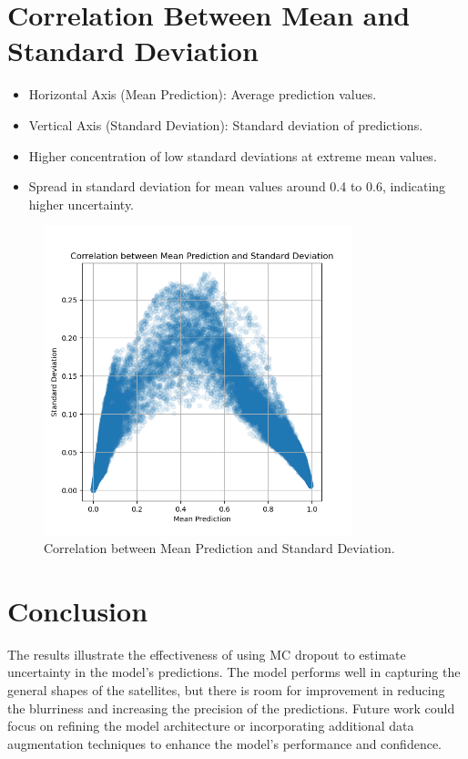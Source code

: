 \documentclass{article}
\begin{document}
\section{Correlation Between Mean and Standard Deviation}
\begin{itemize}
    \item Horizontal Axis (Mean Prediction): Average prediction values.
    \item Vertical Axis (Standard Deviation): Standard deviation of predictions.
    \item Higher concentration of low standard deviations at extreme mean values.
    \item Spread in standard deviation for mean values around 0.4 to 0.6, indicating higher uncertainty.
\end{itemize}

\begin{figure}[h]
    \centering
    \includegraphics[width=0.8\textwidth]{../images/MC_dropout/test_image[0]_correlation_between_mean_prediction_and_std.png}
    \caption{Correlation between Mean Prediction and Standard Deviation.}
    \label{fig:correlation_analysis}
\end{figure}

\section{Conclusion}
The results illustrate the effectiveness of using MC dropout to estimate uncertainty in the model's predictions. The model performs well in capturing the general shapes of the satellites, but there is room for improvement in reducing the blurriness and increasing the precision of the predictions. Future work could focus on refining the model architecture or incorporating additional data augmentation techniques to enhance the model's performance and confidence.
\end{document}
